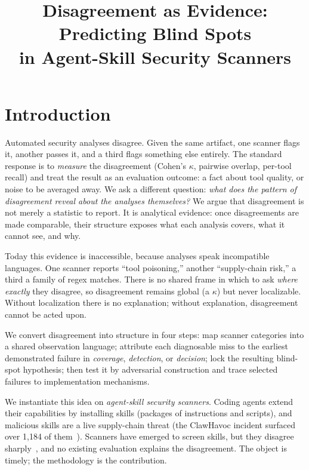 \documentclass[sigconf,nonacm]{acmart}
\title{Disagreement as Evidence: Predicting Blind Spots\\in Agent-Skill Security Scanners}
\begin{document}
\maketitle

\section{Introduction}
\label{sec:intro}

Automated security analyses disagree.
Given the same artifact, one scanner flags it, another passes it, and a third flags something else entirely.
The standard response is to \emph{measure} the disagreement (Cohen's $\kappa$, pairwise overlap, per-tool recall) and treat the result as an evaluation outcome: a fact about tool quality, or noise to be averaged away.
We ask a different question: \emph{what does the pattern of disagreement reveal about the analyses themselves?}
We argue that disagreement is not merely a statistic to report.
It is analytical evidence: once disagreements are made comparable, their structure exposes what each analysis covers, what it cannot see, and why.

Today this evidence is inaccessible, because analyses speak incompatible languages.
One scanner reports ``tool poisoning,'' another ``supply-chain risk,'' a third a family of regex matches.
There is no shared frame in which to ask \emph{where exactly} they disagree, so disagreement remains global (a $\kappa$) but never localizable.
Without localization there is no explanation; without explanation, disagreement cannot be acted upon.

We convert disagreement into structure in four steps: map scanner categories into a shared observation language; attribute each diagnosable miss to the earliest demonstrated failure in \emph{coverage}, \emph{detection}, or \emph{decision}; lock the resulting blind-spot hypothesis; then test it by adversarial construction and trace selected failures to implementation mechanisms.

We instantiate this idea on \emph{agent-skill security scanners}.
Coding agents extend their capabilities by installing skills (packages of instructions and scripts), and malicious skills are a live supply-chain threat (the ClawHavoc incident surfaced over 1{,}184 of them~\cite{clawhub2026}).
Scanners have emerged to screen skills, but they disagree sharply~\cite{clawhub2026,locatejudge2026}, and no existing evaluation explains the disagreement.
The object is timely; the methodology is the contribution.
\end{document}
